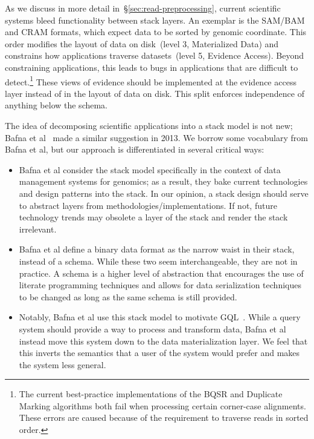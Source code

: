 \documentclass[phd]{ucbthesis}
\begin{document}
As we discuss in more detail in~\S\ref{sec:read-preprocessing}, current scientific systems bleed
functionality between stack layers. An exemplar is the SAM/BAM and CRAM formats, which expect data
to be sorted by genomic coordinate. This order modifies the layout of data on disk~(level 3, Materialized Data)
and constrains how applications traverse datasets~(level 5, Evidence Access). Beyond
constraining applications, this leads to bugs in applications that are difficult to detect.\footnote{The
current best-practice implementations of the BQSR and Duplicate Marking algorithms both fail when
processing certain corner-case alignments. These errors are caused because of the requirement to
traverse reads in sorted order.} These views of evidence should be implemented at the evidence
access layer instead of in the layout of data on disk. This split enforces independence of anything below the
schema.

The idea of decomposing scientific applications into a stack model is not new; Bafna et al~\cite{bafna13}
made a similar suggestion in 2013. We borrow some vocabulary from Bafna et al, but our approach is
differentiated in several critical ways:

\begin{itemize}
\item Bafna et al consider the stack model specifically in the context of data management systems for
genomics; as a result, they bake current technologies and design patterns into the stack. In our opinion,
a stack design should serve to abstract layers from methodologies/implementations. If not, future
technology trends may obsolete a layer of the stack and render the stack irrelevant.
\item Bafna et al define a binary data format as the narrow waist in their stack, instead of a schema.
While these two seem interchangeable, they are not in practice. A schema is a higher level of abstraction
that encourages the use of literate programming techniques and allows for data serialization techniques
to be changed as long as the same schema is still provided.
\item Notably, Bafna et al use this stack model to motivate GQL~\cite{kozanitis14}. While a query system
should provide a way to process and transform data, Bafna et al instead move this system down to the
data materialization layer. We feel that this inverts the semantics that a user of the system would prefer
and makes the system less general.
\end{itemize}
\end{document}
